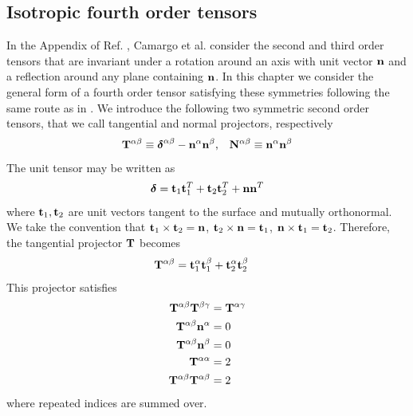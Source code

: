 \documentclass[b5paper,openright,10pt]{book}
\begin{document}
\begin{appendices}
\chapter{Isotropic fourth order tensors}
\label{Ap:Iso}
In the  Appendix of  Ref. \cite{CamargoBC2018},  Camargo et al. consider  the second  and third
order tensors that are invariant under  a rotation around an axis with
unit vector  ${\bf n}$  and a  reflection around any
plane containing ${\bf n}$. In this chapter  we consider  the general
form  of a  fourth order  tensor satisfying these symmetries following the same route as in \cite{CamargoBC2018}.
We introduce the following two
symmetric second  order tensors,  that we  call tangential  and normal
projectors, respectively
\begin{align}
  {\bf T}^{\alpha\beta}\equiv\boldsymbol{\delta}^{\alpha\beta}-{\bf n}^\alpha{\bf n}^\beta, &&
{\bf  N}^{\alpha\beta}\equiv{\bf n}^\alpha{\bf n}^\beta
\end{align}
The unit tensor may be 
written as
\begin{align}
\boldsymbol{\delta}={\bf t}_1{\bf t}_1^T+{\bf t}_2{\bf t}_2^T+{\bf n}{\bf n}^T
\end{align}
where ${\bf  t}_1,{\bf t}_2$ are  unit vectors tangent to  the surface
and  mutually   orthonormal.   We  take  the   convention  that  ${\bf
  t}_1\times{\bf  t}_2={\bf n}$,  ${\bf t}_2\times{\bf  n}={\bf t}_1$,
${\bf     n}\times{\bf     t}_1={\bf    t}_2$.      Therefore,     the
tangential projector ${\bf T}$ becomes
\begin{align}
    {\bf T}^{\alpha\beta}&={\bf t}_1^\alpha{\bf t}_1^\beta+{\bf t}^\alpha_2{\bf t}_2^\beta
\end{align}
This projector satisfies
\begin{align}
  {\bf T}^{\alpha\beta}  {\bf T}^{\beta\gamma}&= {\bf T}^{\alpha\gamma} 
\nonumber\\
  {\bf T}^{\alpha\beta}{\bf n}^\alpha&=0
\nonumber\\
  {\bf T}^{\alpha\beta}{\bf n}^\beta&=0
\nonumber\\
  {\bf T}^{\alpha\alpha}&=2
\nonumber\\
  {\bf T}^{\alpha\beta}  {\bf T}^{\alpha\beta}&=2
\label{tprop}
\end{align}
where repeated indices are summed over. 


\end{appendices}
\end{document}
